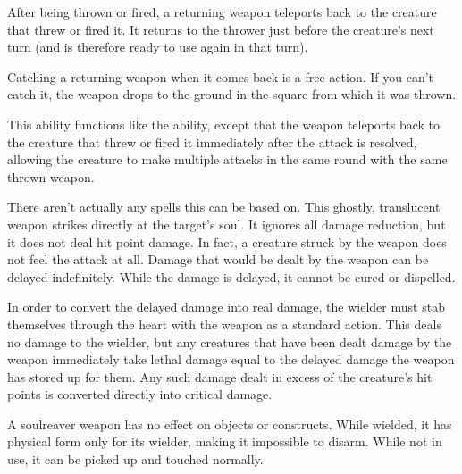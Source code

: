
 After being thrown or fired, a returning weapon teleports back to the creature that threw or fired it.
It returns to the thrower just before the creature's next turn (and is therefore ready to use again in that turn).

Catching a returning weapon when it comes back is a free action.
If you can't catch it, the weapon drops to the ground in the square from which it was thrown.


 This ability functions like the  ability, except that the weapon teleports back to the creature that threw or fired it immediately after the attack is resolved, allowing the creature to make multiple attacks in the same round with the same thrown weapon.


There aren't actually any spells this can be based on.
 This ghostly, translucent weapon strikes directly at the target's soul.
It ignores all damage reduction, but it does not deal hit point damage.
In fact, a creature struck by the weapon does not feel the attack at all.
Damage that would be dealt by the weapon can be delayed indefinitely.
While the damage is delayed, it cannot be cured or dispelled.

In order to convert the delayed damage into real damage, the wielder must stab themselves through the heart with the weapon as a standard action.
This deals no damage to the wielder, but any creatures that have been dealt damage by the weapon immediately take lethal damage equal to the delayed damage the weapon has stored up for them.
Any such damage dealt in excess of the creature's hit points is converted directly into critical damage.

A soulreaver weapon has no effect on objects or constructs.
While wielded, it has physical form only for its wielder, making it impossible to disarm.
While not in use, it can be picked up and touched normally.

